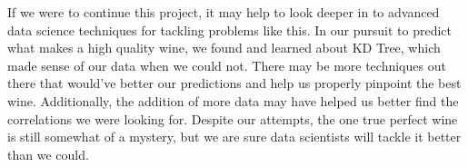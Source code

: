 \documentclass[11pt]{article}
\begin{document}
If we were to continue this project, it may help to look deeper in to
advanced data science techniques for tackling problems like this. In our
pursuit to predict what makes a high quality wine, we found and learned
about KD Tree, which made sense of our data when we could not. There may
be more techniques out there that would've better our predictions and
help us properly pinpoint the best wine. Additionally, the addition of
more data may have helped us better find the correlations we were
looking for. Despite our attempts, the one true perfect wine is still
somewhat of a mystery, but we are sure data scientists will tackle it
better than we could.


    
    
    
    
\end{document}
